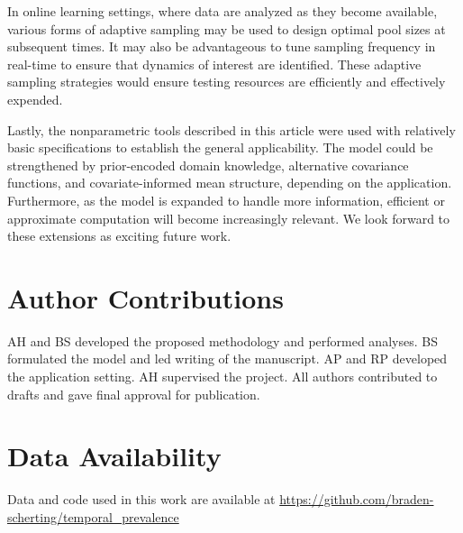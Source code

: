\documentclass{article}
\begin{document}
In online learning settings, where data are analyzed as they become available, various forms of adaptive sampling may be used to design optimal pool sizes at subsequent times. It may also be advantageous to tune sampling frequency in real-time to ensure that dynamics of interest are identified. These adaptive sampling strategies would ensure testing resources are efficiently and effectively expended.

Lastly, the nonparametric tools described in this article were used with relatively basic specifications to establish the general applicability. The model could be strengthened by prior-encoded domain knowledge, alternative covariance functions, and covariate-informed mean structure, depending on the application. Furthermore, as the model is expanded to handle more information, efficient or approximate computation will become increasingly relevant. We look forward to these extensions as exciting future work. 

\section*{Author Contributions}
AH and BS developed the proposed methodology and performed analyses. BS formulated the model and led writing of the manuscript. AP and RP developed the application setting. AH supervised the project. All authors contributed to drafts and gave final approval for publication.

\section*{Data Availability}
Data and code used in this work are available at \url{https://github.com/braden-scherting/temporal_prevalence}



  
  
\end{document}
